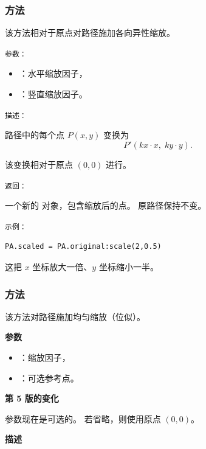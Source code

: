\subsubsection{方法 }
\label{ssub:path_scale}

该方法相对于原点对路径施加各向异性缩放。

\medskip

\texttt{参数： }
\begin{itemize}
  \item {}：水平缩放因子，
  \item {}：竖直缩放因子。
\end{itemize}

\medskip

\texttt{描述： }

路径中的每个点 $P(x,y)$ 变换为
\[
P'(kx \cdot x,\; ky \cdot y).
\]

该变换相对于原点 $(0,0)$ 进行。

\medskip

\texttt{返回： }

一个新的  对象，包含缩放后的点。
原路径保持不变。

\medskip

\texttt{示例： }

\begin{verbatim}
PA.scaled = PA.original:scale(2,0.5)
\end{verbatim}

这把 $x$ 坐标放大一倍、$y$ 坐标缩小一半。

\subsubsection{方法 }
\label{ssub:path_homothety}

该方法对路径施加均匀缩放（位似）。

\medskip

\textbf{参数}
\begin{itemize}
  \item {}：缩放因子，
  \item {}：可选参考点。
\end{itemize}

\medskip

\textbf{第 5 版的变化}

 参数现在是可选的。
若省略，则使用原点 $(0,0)$。

\medskip

\textbf{描述}

